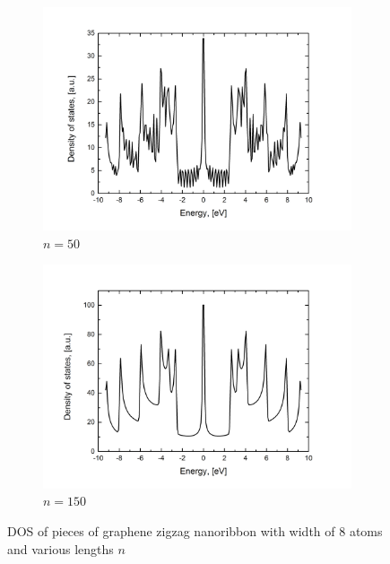 \begin{figure}[hb!]
\begin{subfigure}{.45\textwidth}
  \includegraphics[width=\linewidth]{img/zz_chain_50_dos}
  \caption{$n=50$}
  \label{fig:chain50}
\end{subfigure}
\begin{subfigure}{.45\textwidth}
  \centering
  \includegraphics[width=\linewidth]{img/zz_chain_150_dos}
  \caption{$n=150$}
  \label{fig:chain100}
\end{subfigure}
\caption{DOS of pieces of graphene zigzag nanoribbon with width of $8$ atoms and various lengths $n$\label{fig:zz_chain}}
\end{figure}

